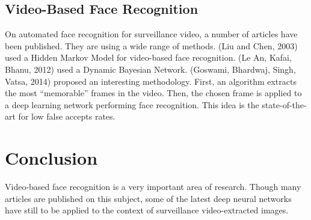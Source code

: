 \subsection{Video-Based Face Recognition}

On automated face recognition for surveillance video, a number of articles have been published. They are using a wide range of methods. (Liu and Chen, 2003) used a Hidden Markov Model for video-based face recognition. (Le An, Kafai, Bhanu, 2012) used a Dynamic Bayesian Network. (Goswami, Bhardwaj, Singh, Vatsa, 2014) proposed an interesting methodology. First, an algorithm extracts the most \enquote{memorable} frames in the video. Then, the chosen frame is applied to a deep learning network performing face recognition. This idea is the state-of-the-art for low false accepts rates.

\section{Conclusion}

Video-based face recognition is a very important area of research. Though many articles are published on this subject, some of the latest deep neural networks have still to be applied to the context of surveillance video-extracted images.